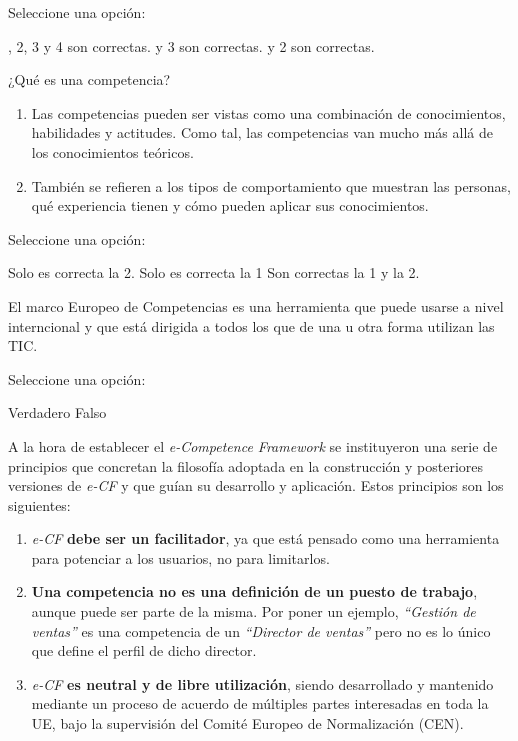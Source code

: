 \documentclass[a4paper]{exam}
\begin{document}
\begin{questions}
  Seleccione una opción:
  
  \begin{choices}
    , 2, 3 y 4 son correctas.
     y 3 son correctas.
     y 2 son correctas.
  \end{choices}
  
  \question ¿Qué es una competencia?

  \begin{enumerate}
  \item Las competencias pueden ser vistas como una combinación de
    conocimientos, habilidades y actitudes. Como tal, las competencias
    van mucho más allá de los conocimientos teóricos.
  \item También se refieren a los tipos de comportamiento que muestran
    las personas, qué experiencia tienen y cómo pueden aplicar sus
    conocimientos.
  \end{enumerate}

  Seleccione una opción:

  \begin{choices}
    \choice Solo es correcta la 2.
    \choice Solo es correcta la 1
    \CorrectChoice Son correctas la 1 y la 2.
  \end{choices}

  \question El marco Europeo de Competencias es una herramienta que
  puede usarse a nivel interncional y que está dirigida a todos los
  que de una u otra forma utilizan las TIC.

  Seleccione una opción:

  \begin{choices}
    \CorrectChoice Verdadero
    \choice Falso
  \end{choices}

  \question A la hora de establecer el \emph{e-Competence Framework}
  se instituyeron una serie de principios que concretan la filosofía
  adoptada en la construcción y posteriores versiones de \emph{e-CF} y
  que guían su desarrollo y aplicación. Estos principios son los
  siguientes:

  \begin{enumerate}
  \item \emph{e-CF} \textbf{debe ser un facilitador}, ya que está
    pensado como una herramienta para potenciar a los usuarios, no
    para limitarlos.
  \item \textbf{Una competencia no es una definición de un puesto de
      trabajo}, aunque puede ser parte de la misma. Por poner un
    ejemplo, \emph{``Gestión de ventas''} es una competencia de un
    \emph{``Director de ventas''} pero no es lo único que define el
    perfil de dicho director.
  \item \emph{e-CF} \textbf{es neutral y de libre utilización}, siendo
    desarrollado y mantenido mediante un proceso de acuerdo de
    múltiples partes interesadas en toda la UE, bajo la supervisión
    del Comité Europeo de Normalización (CEN).
  \end{enumerate}


\end{questions}
\end{document}
